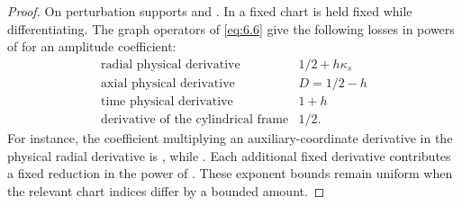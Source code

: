 \begin{proof}
On perturbation supports  and
. In a fixed chart  is held fixed while
differentiating. The graph operators of \eqref{eq:6.6} give the following losses in powers of
 for an amplitude coefficient:
\begin{equation}
\begin{array}{r|l}
\text{radial physical derivative} & 1/2+h\kappa_s\\
\text{axial physical derivative} & D=1/2-h\\
\text{time physical derivative} & 1+h\\
\text{derivative of the cylindrical frame} & 1/2.
\end{array}
\tag{9.19}\label{eq:9.19}
\end{equation}
For instance, the coefficient multiplying an auxiliary-coordinate derivative in the physical radial
derivative is
,
while . Each additional fixed derivative
contributes a fixed reduction in the power of . These exponent bounds
remain uniform when the relevant chart indices differ by a bounded amount.


\end{proof}
